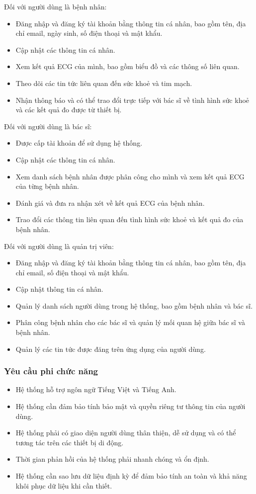 \documentclass{article}%
\begin{document}
Đối với người dùng là bệnh nhân:
\begin{itemize}
    \item Đăng nhập và đăng ký tài khoản bằng thông tin cá nhân, bao gồm tên, địa chỉ email, ngày sinh, số điện thoại và mật khẩu.
    \item Cập nhật các thông tin cá nhân.
    \item Xem kết quả ECG của mình, bao gồm biểu đồ và các thông số liên quan.
    \item Theo dõi các tin tức liên quan đến sức khoẻ và tim mạch.
    \item Nhận thông báo và có thể trao đổi trực tiếp với bác sĩ về tình hình sức khoẻ và các kết quả đo được từ thiết bị.
\end{itemize}

Đối với người dùng là bác sĩ:

\begin{itemize}
    \item Được cấp tài khoản để sử dụng hệ thống.
    \item Cập nhật các thông tin cá nhân.
    \item Xem danh sách bệnh nhân được phân công cho mình và xem kết quả ECG của từng bệnh nhân.
    \item Đánh giá và đưa ra nhận xét về kết quả ECG của bệnh nhân.
    \item Trao đổi các thông tin liên quan đến tình hình sức khoẻ và kết quả đo của bệnh nhân.
\end{itemize}

Đối với người dùng là quản trị viên:
\begin{itemize}
    \item Đăng nhập và đăng ký tài khoản bằng thông tin cá nhân, bao gồm tên, địa chỉ email, số điện thoại và mật khẩu.
    \item Cập nhật thông tin cá nhân.
    \item Quản lý danh sách người dùng trong hệ thống, bao gồm bệnh nhân và bác sĩ.
    \item Phân công bệnh nhân cho các bác sĩ và quản lý mối quan hệ giữa bác sĩ và bệnh nhân.
    \item Quản lý các tin tức được đăng trên ứng dụng của người dùng.
\end{itemize}

\subsubsection{Yêu cầu phi chức năng}
\begin{itemize}
    \item Hệ thống hỗ trợ ngôn ngữ Tiếng Việt và Tiếng Anh.
    \item Hệ thống cần đảm bảo tính bảo mật và quyền riêng tư thông tin của người dùng.
    \item Hệ thống phải có giao diện người dùng thân thiện, dễ sử dụng và có thể tương tác trên các thiết bị di động.
    \item Thời gian phản hồi của hệ thống phải nhanh chóng và ổn định.
    \item Hệ thống cần sao lưu dữ liệu định kỳ để đảm bảo tính an toàn và khả năng khôi phục dữ liệu khi cần thiết.
\end{itemize}
\end{document}
